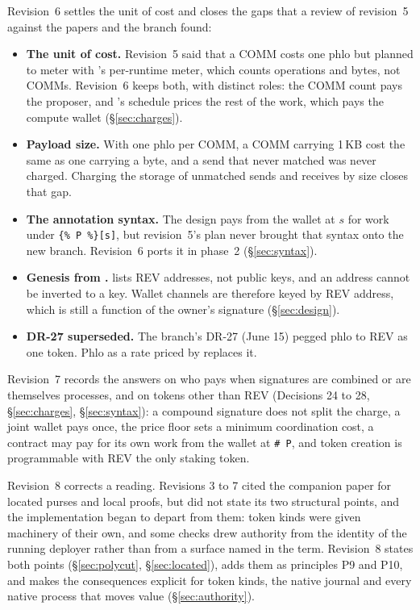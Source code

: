 \documentclass[11pt]{article}
\newcommand{\code}{\path}
\newcommand{\signed}[2]{\texttt{\{\%\,#1\,\%\}[#2]}}
\begin{document}
Revision~6 settles the unit of cost and closes the gaps that a review of revision~5 against the papers and the branch found:
\begin{itemize}
\item \textbf{The unit of cost.} Revision~5 said that a COMM costs one phlo but planned to meter with \code{dev}'s per-runtime meter, which counts operations and bytes, not COMMs. Revision~6 keeps both, with distinct roles: the COMM count pays the proposer, and \code{dev}'s schedule prices the rest of the work, which pays the compute wallet (\S\ref{sec:charges}).
\item \textbf{Payload size.} With one phlo per COMM, a COMM carrying 1\,KB cost the same as one carrying a byte, and a send that never matched was never charged. Charging the storage of unmatched sends and receives by size closes that gap.
\item \textbf{The annotation syntax.} The design pays from the wallet at $s$ for work under \signed{P}{s}, but revision~5's plan never brought that syntax onto the new branch. Revision~6 ports it in phase~2 (\S\ref{sec:syntax}).
\item \textbf{Genesis from \code{wallets.txt}.} \code{wallets.txt} lists REV addresses, not public keys, and an address cannot be inverted to a key. Wallet channels are therefore keyed by REV address, which is still a function of the owner's signature (\S\ref{sec:design}).
\item \textbf{DR-27 superseded.} The branch's DR-27 (June 15) pegged phlo to REV as one token. Phlo as a rate priced by \code{phloPrice} replaces it.
\end{itemize}

Revision~7 records the answers on who pays when signatures are combined or are themselves processes, and on tokens other than REV (Decisions 24 to 28, \S\ref{sec:charges}, \S\ref{sec:syntax}): a compound signature does not split the charge, a joint wallet pays once, the price floor sets a minimum coordination cost, a contract may pay for its own work from the wallet at \texttt{\# P}, and token creation is programmable with REV the only staking token.

Revision~8 corrects a reading. Revisions 3 to 7 cited the companion paper for located purses and local proofs, but did not state its two structural points, and the implementation began to depart from them: token kinds were given machinery of their own, and some checks drew authority from the identity of the running deployer rather than from a surface named in the term. Revision~8 states both points (\S\ref{sec:polycut}, \S\ref{sec:located}), adds them as principles P9 and P10, and makes the consequences explicit for token kinds, the native journal and every native process that moves value (\S\ref{sec:authority}).
\end{document}
